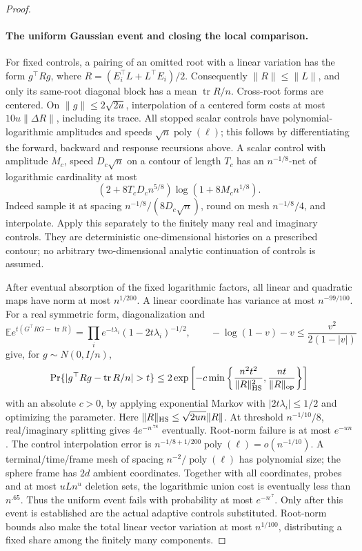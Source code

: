 \begin{proof}
\paragraph{The uniform Gaussian event and closing the local comparison.}
For fixed controls, a pairing of an omitted root with a linear
variation has the form \(g^\top Rg\), where
\(R=(E_i^\top L+L^\top E_i)/2\).  Consequently
\(\|R\|\le\|L\|\), and only its same-root diagonal block has a
mean \(\operatorname{tr}R/n\).  Cross-root forms are centered.
On \(\|g\|\le2\sqrt{2u}\), interpolation of a centered form costs
at most \(10u\|\Delta R\|\), including its trace.
All stopped scalar controls have polynomial-logarithmic amplitudes
and speeds \(\sqrt n\operatorname{poly}(\ell)\); this follows by
differentiating the forward, backward and response recursions above.
A scalar control with amplitude \(M_c\), speed \(D_c\sqrt n\)
on a contour of length \(T_c\) has an \(n^{-1/8}\)-net of
logarithmic cardinality at most
\[
 (2+8T_cD_cn^{5/8})\log(1+8M_cn^{1/8}).
\]
Indeed sample it at spacing \(n^{-1/8}/(8D_c\sqrt n)\), round
on mesh \(n^{-1/8}/4\), and interpolate.  Apply this separately to
the finitely many real and imaginary controls.  They are deterministic
one-dimensional histories on a prescribed contour; no arbitrary
two-dimensional analytic continuation of controls is assumed.

After eventual absorption of the fixed logarithmic factors, all
linear and quadratic maps have norm at most \(n^{1/200}\).
A linear coordinate has variance at most \(n^{-99/100}\).
For a real symmetric form, diagonalization and
\[
 \mathbb E e^{t(G^\top RG-\operatorname{tr}R)}
 =\prod_i e^{-t\lambda_i}(1-2t\lambda_i)^{-1/2},\qquad
 -\log(1-v)-v\le\frac{v^2}{2(1-|v|)}
\]
give, for \(g\sim N(0,I/n)\),
\[
 \Pr\{|g^\top Rg-\operatorname{tr}R/n|>t\}
 \le2\exp\left[-c\min\left\{
       \frac{n^2t^2}{\|R\|_{\rm HS}^2},
       \frac{nt}{\|R\|_{\rm op}}\right\}\right]
\]
with an absolute \(c>0\), by applying exponential Markov with
\(|2t\lambda_i|\le1/2\) and optimizing the parameter.
Here \(\|R\|_{\rm HS}\le\sqrt{2un}\|R\|\).  At threshold
\(n^{-1/10}/8\), real/imaginary splitting gives
\(4e^{-n^{.78}}\) eventually.  Root-norm failure is at most
\(e^{-un}\).  The control interpolation error is
\(n^{-1/8+1/200}\operatorname{poly}(\ell)=o(n^{-1/10})\).
A terminal/time/frame mesh of spacing
\(n^{-2}/\operatorname{poly}(\ell)\) has polynomial size;
the sphere frame has \(2d\) ambient coordinates.  Together with
all coordinates, probes and at most \(uLn^u\) deletion sets, the
logarithmic union cost is eventually less than \(n^{.65}\).
Thus the uniform event fails with probability at most \(e^{-n^{.7}}\).
Only after this event is established are the actual adaptive controls
substituted.  Root-norm bounds also make the total linear vector
variation at most \(n^{1/100}\), distributing a fixed share among
the finitely many components.


\end{proof}
